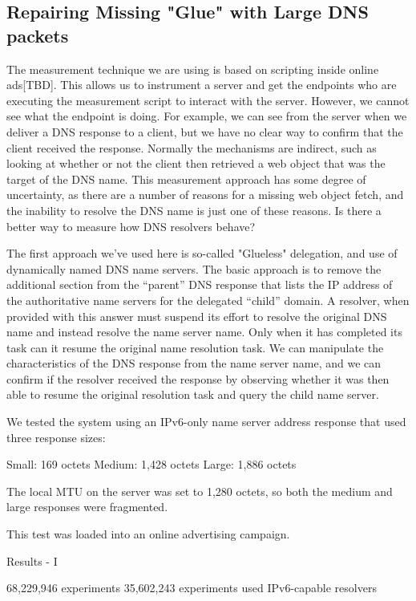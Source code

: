 \subsection{Repairing Missing "Glue" with Large DNS packets}

The measurement technique we are using is based on scripting inside online ads[TBD]. This allows us to instrument a server and get the endpoints who are executing the measurement script to interact with the server. However, we cannot see what the endpoint is doing. For example, we can see from the server when we deliver a DNS response to a client, but we have no clear way to confirm that the client received the response. Normally the mechanisms are indirect, such as looking at whether or not the client then retrieved a web object that was the target of the DNS name. This measurement approach has some degree of uncertainty, as there are a number of reasons for a missing web object fetch, and the inability to resolve the DNS name is just one of these reasons. Is there a better way to measure how DNS resolvers behave?

The first approach we’ve used here is so-called "Glueless" delegation, and use of dynamically named DNS name servers. The basic approach is to remove the additional section from the “parent” DNS response that lists the IP address of the authoritative name servers for the delegated “child” domain. A resolver, when provided with this answer must suspend its effort to resolve the original DNS name and instead resolve the name server name. Only when it has completed its task can it resume the original name resolution task. We can manipulate the characteristics of the DNS response from the name server name, and we can confirm if the resolver received the response by observing whether it was then able to resume the original resolution task and query the child name server.

We tested the system using an IPv6-only name server address response that used three response sizes:

Small: 169 octets
Medium: 1,428 octets
Large: 1,886 octets

The local MTU on the server was set to 1,280 octets, so both the medium and large responses were fragmented.

This test was loaded into an online advertising campaign.

Results - I 

68,229,946 experiments 
35,602,243 experiments used IPv6-capable resolvers 


